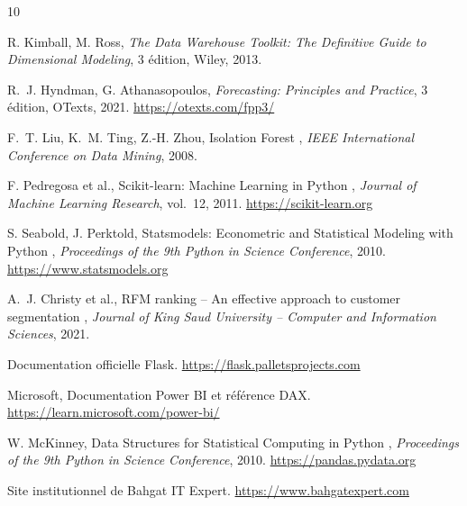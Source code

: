 \documentclass[12pt,a4paper]{report}
\begin{document}
\begin{thebibliography}{10}

 R. Kimball, M. Ross, \textit{The Data Warehouse Toolkit:
  The Definitive Guide to Dimensional Modeling}, 3\ieme{} édition, Wiley,
  2013.

 R.~J. Hyndman, G. Athanasopoulos, \textit{Forecasting:
  Principles and Practice}, 3\ieme{} édition, OTexts, 2021.
  \url{https://otexts.com/fpp3/}

 F.~T. Liu, K.~M. Ting, Z.-H. Zhou, \og Isolation
  Forest \fg{}, \textit{IEEE International Conference on Data Mining}, 2008.

 F. Pedregosa et al., \og Scikit-learn: Machine Learning in
  Python \fg{}, \textit{Journal of Machine Learning Research}, vol.~12, 2011.
  \url{https://scikit-learn.org}

 S. Seabold, J. Perktold, \og Statsmodels: Econometric
  and Statistical Modeling with Python \fg{}, \textit{Proceedings of the 9th
  Python in Science Conference}, 2010. \url{https://www.statsmodels.org}

 A.~J. Christy et al., \og RFM ranking -- An effective approach
  to customer segmentation \fg{}, \textit{Journal of King Saud University --
  Computer and Information Sciences}, 2021.

 Documentation officielle Flask.
  \url{https://flask.palletsprojects.com}

 Microsoft, Documentation Power BI et référence DAX.
  \url{https://learn.microsoft.com/power-bi/}

 W. McKinney, \og Data Structures for Statistical Computing in
  Python \fg{}, \textit{Proceedings of the 9th Python in Science Conference},
  2010. \url{https://pandas.pydata.org}

 Site institutionnel de Bahgat IT Expert.
  \url{https://www.bahgatexpert.com}

\end{thebibliography}

\appendix
\end{document}
